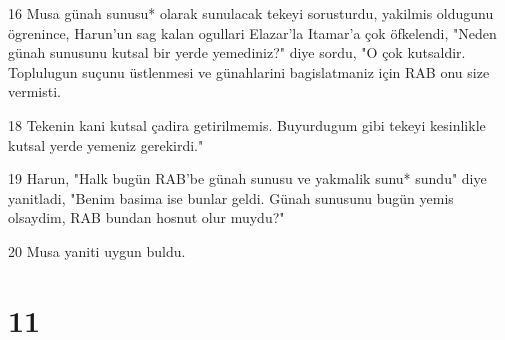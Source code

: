 \par 16 Musa günah sunusu* olarak sunulacak tekeyi sorusturdu, yakilmis oldugunu ögrenince, Harun'un sag kalan ogullari Elazar'la Itamar'a çok öfkelendi, "Neden günah sunusunu kutsal bir yerde yemediniz?" diye sordu, "O çok kutsaldir. Toplulugun suçunu üstlenmesi ve günahlarini bagislatmaniz için RAB onu size vermisti.
\par 18 Tekenin kani kutsal çadira getirilmemis. Buyurdugum gibi tekeyi kesinlikle kutsal yerde yemeniz gerekirdi."
\par 19 Harun, "Halk bugün RAB'be günah sunusu ve yakmalik sunu* sundu" diye yanitladi, "Benim basima ise bunlar geldi. Günah sunusunu bugün yemis olsaydim, RAB bundan hosnut olur muydu?"
\par 20 Musa yaniti uygun buldu.

\chapter{11}

